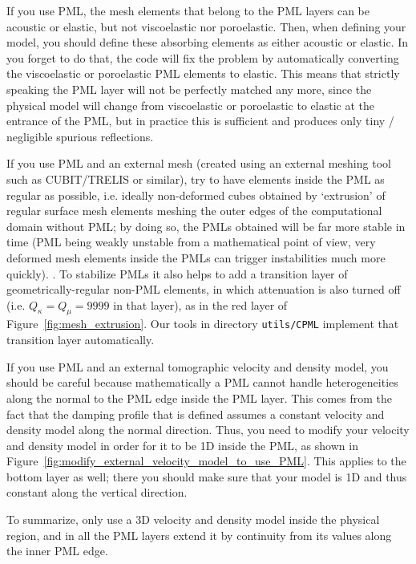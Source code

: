 If you use PML, the mesh elements that belong to the PML layers can
be acoustic or elastic, but not viscoelastic nor poroelastic. Then,
when defining your model, you should define these absorbing elements
as either acoustic or elastic. In you forget to do that, the code
will fix the problem by automatically converting the viscoelastic
or poroelastic PML elements to elastic. This means that strictly speaking
the PML layer will not be perfectly matched any more, since the physical
model will change from viscoelastic or poroelastic to elastic at the
entrance of the PML, but in practice this is sufficient and produces
only tiny / negligible spurious reflections.\newline


If you use PML and an external mesh (created using an external meshing tool
such as CUBIT/TRELIS or similar), try to have elements inside the PML as regular as possible,
i.e. ideally non-deformed cubes obtained by `extrusion' of regular surface mesh elements meshing the
outer edges of the computational domain without PML; by doing so, the PMLs obtained will be far more stable
in time (PML being weakly unstable from a mathematical point of view, very deformed mesh elements
inside the PMLs can trigger instabilities much more quickly). . To stabilize PMLs it also helps to add a transition layer of geometrically-regular non-PML elements, in which attenuation is also
turned off (i.e. $Q_\kappa = Q_\mu = 9999$ in that layer), as in the red layer of Figure~\ref{fig:mesh_extrusion}.
Our tools in directory \texttt{utils/CPML} implement that transition layer automatically.\newline


If you use PML and an external tomographic velocity and density model,
you should be careful because mathematically a PML cannot handle heterogeneities
along the normal to the PML edge inside the PML layer. This comes
from the fact that the damping profile that is defined assumes a constant
velocity and density model along the normal direction.
Thus, you need to modify your velocity and density model in order
for it to be 1D inside the PML, as shown in Figure~\ref{fig:modify_external_velocity_model_to_use_PML}.
This applies to the bottom layer as well; there you should make sure
that your model is 1D and thus constant along the vertical direction.\newline


To summarize, only use a 3D velocity and density model inside the
physical region, and in all the PML layers extend it by continuity
from its values along the inner PML edge.\newline

